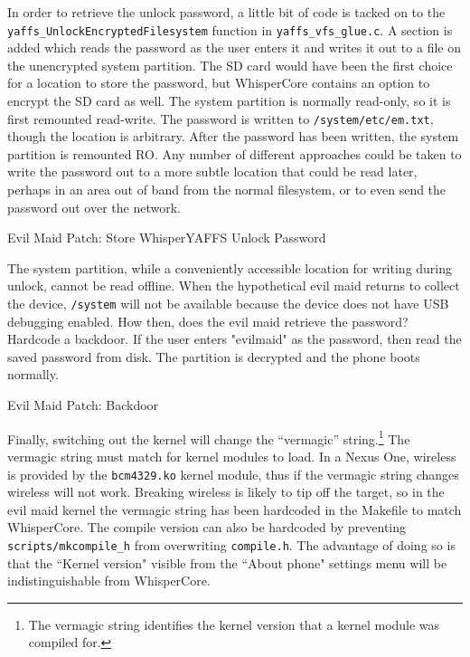 In order to retrieve the unlock password, a little bit of code is tacked on to the \texttt{yaffs\_UnlockEncryptedFilesystem}
function in \texttt{yaffs\_vfs\_glue.c}. A section is added which reads the password as the user enters it and writes it
out to a file on the unencrypted system partition.  The SD card would have been the first choice for a location to store the
password, but WhisperCore contains an option to encrypt the SD card as well. The system partition is normally read-only, so it is
first remounted read-write. The password is written to \texttt{/system/etc/em.txt}, though the location is arbitrary. After the password has
been written, the system partition is remounted RO. Any number of different approaches could be taken to write the password out to a
more subtle location that could be read later, perhaps in an area out of band from the normal filesystem, or to even send the
password out over the network. 

\begin{table}

\label{tab:storepass}
\caption{Evil Maid Patch: Store WhisperYAFFS Unlock Password}
\end{table}

The system partition, while a conveniently accessible location for writing during unlock, cannot be read offline.  When the
hypothetical evil maid returns to collect the device, \texttt{/system} will not be available because the device does not have USB
debugging enabled.  How then, does the evil maid retrieve the password? Hardcode a backdoor.  If the user enters "evilmaid" as the
password, then read the saved password from disk.  The partition is decrypted and the phone boots normally. 

\begin{table}

\label{tab:backdoor}
\caption{Evil Maid Patch: Backdoor}
\end{table}

Finally, switching out the kernel will change the ``vermagic'' string.\footnote{The vermagic string identifies the kernel version
that a kernel module was compiled for.} The vermagic string must match for kernel modules to load.  In a Nexus One, wireless is
provided by the \texttt{bcm4329.ko} kernel module, thus if the vermagic string changes wireless will not work.  Breaking wireless is likely
to tip off the target, so in the evil maid kernel the vermagic string has been hardcoded in the Makefile to match WhisperCore. 
The compile version can also be hardcoded by preventing \texttt{scripts/mkcompile\_h} from overwriting \texttt{compile.h}. 
The advantage of doing so is that the ``Kernel version" visible from the ``About phone" settings menu will be indistinguishable from WhisperCore.


